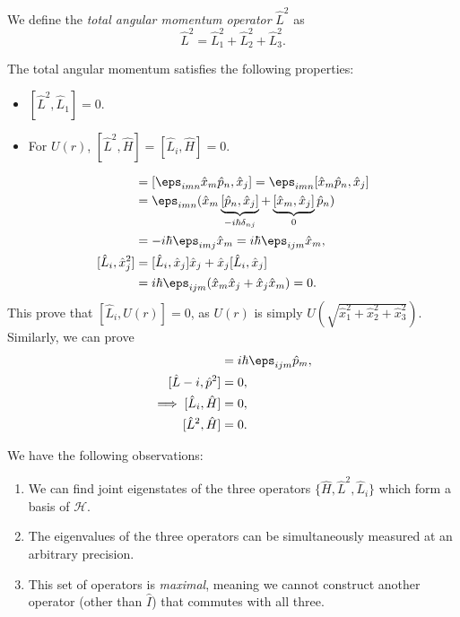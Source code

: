\documentclass[12pt]{article}
\begin{document}
\begin{definition}
	We define the \textit{total angular momentum operator} $\hat L^2$ as
	\[
	\hat L^2 = \hat L_1^2 + \hat L_2^2 + \hat L_3^2
	.\]
\end{definition}

The total angular momentum satisfies the following properties:
\begin{itemize}
	\item $[\hat L^2, \hat L_1] = 0$.
	\item For $U(r)$, $[\hat L^2, \hat H] = [\hat L_i, \hat H] = 0$.
\end{itemize}

\begin{proofbox}
	\begin{align*}
		[\hat L_i, \hat x_j] &= [\eps_{imn}\hat x_m \hat p_n, \hat x_j] = \eps_{imn} [\hat x_m \hat p_n, \hat x_j] \\
				     &= \eps_{imn}(\hat x_m \underbrace{[\hat p_n, \hat x_j]}_{-i\hbar\delta_{nj}} + \underbrace{[\hat x_m, \hat x_j]}_{0} \hat p_n) \\
				     &= - i \hbar \eps_{imj} \hat x_m = i \hbar \eps_{ijm}\hat x_m, \\
		[\hat L_i, \hat x_j^2] &= [\hat L_i, \hat x_j] \hat x_j + \hat x_j [\hat L_i, \hat x_j] \\
				       &= i \hbar \eps_{ijm}(\hat x_m \hat x_j + \hat x_j \hat x_m) = 0.
	\end{align*}
	This prove that $[\hat L_i, U(r)] = 0$, as $U(r)$ is simply $U(\sqrt{\hat x_1^2 + \hat x_2^2 + \hat x_3^2})$. Similarly, we can prove
	\begin{align*}
		[\hat L_i, \hat p_j] &= i \hbar \eps_{ijm} \hat p_m, \\
		[\hat L-i, \hat p^2] &= 0, \\
		\implies [\hat L_i, \hat H] &= 0, \\
		[\hat L^2, \hat H] &= 0.
	\end{align*}
\end{proofbox}

We have the following observations:
\begin{enumerate}[1.]
	\item We can find joint eigenstates of the three operators $\{\hat H, \hat L^2, \hat L_i\}$ which form a basis of $\mathcal{H}$.
	\item The eigenvalues of the three operators can be simultaneously measured at an arbitrary precision.
	\item This set of operators is \textit{maximal}, meaning we cannot construct another operator (other than $\hat I$) that commutes with all three.
\end{enumerate}
\end{document}
